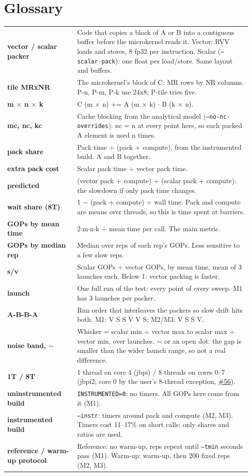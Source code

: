 \documentclass[10pt,a4paper]{article}
\newcommand{\iss}[1]{\href{https://github.com/JieGH/RVV_code_gen_via_MLIR_xDSL/issues/#1}{\##1}}
\begin{document}
\section*{Glossary}
\begin{tabularx}{\textwidth}{@{}>{\bfseries}p{3.4cm} X@{}}
vector / scalar packer & Code that copies a block of A or B into a contiguous buffer before the microkernel reads it. Vector: RVV loads and stores, 8 fp32 per instruction. Scalar (\texttt{--scalar-pack}): one float per load/store. Same layout and buffers. \\
tile MRxNR & The microkernel's block of C: MR rows by NR columns. P-n, P-m, P-k use 24x8; P-tile tries five. \\
m $\times$ n $\times$ k & C (m $\times$ n) += A (m $\times$ k) $\cdot$ B (k $\times$ n). \\
mc, nc, kc & Cache blocking from the analytical model (\texttt{--no-nc-overrides}). nc = n at every point here, so each packed A element is used n times. \\
pack share & Pack time $\div$ (pack + compute), from the instrumented build. A and B together. \\
extra pack cost & Scalar pack time $\div$ vector pack time. \\
predicted & (vector pack + compute) $\div$ (scalar pack + compute): the slowdown if only pack time changes. \\
wait share (8T) & 1 $-$ (pack + compute) $\div$ wall time. Pack and compute are means over threads, so this is time spent at barriers. \\
GOPs by mean time & 2$\cdot$m$\cdot$n$\cdot$k $\div$ mean time per call. The main metric. \\
GOPs by median rep & Median over reps of each rep's GOPs. Less sensitive to a few slow reps. \\
s/v & Scalar GOPs $\div$ vector GOPs, by mean time, mean of 3 launches each. Below 1: vector packing is faster. \\
launch & One full run of the test: every point of every sweep. M1 has 3 launches per packer. \\
A-B-B-A & Run order that interleaves the packers so slow drift hits both. M1: V S S V V S; M2/M3: V S S V. \\
noise band, $\sim$ & Whisker = scalar min $\div$ vector max to scalar max $\div$ vector min, over launches. $\sim$ or an open dot: the gap is smaller than the wider launch range, so not a real difference. \\
1T / 8T & 1 thread on core 4 (jbpi) / 8 threads on cores 0--7 (jbpi2; core 0 by the user's 8-thread exception, \iss{56}). \\
uninstrumented build & \texttt{INSTRUMENTED=0}: no timers. All GOPs here come from it (M1). \\
instrumented build & \texttt{--instr}: timers around pack and compute (M2, M3). Timers cost 11--17\% on short calls; only shares and ratios are used. \\
reference / warm-up protocol & Reference: no warm-up, reps repeat until \texttt{--tmin} seconds pass (M1). Warm-up: warm-up, then 200 fixed reps (M2, M3). \\
\end{tabularx}
\end{document}
